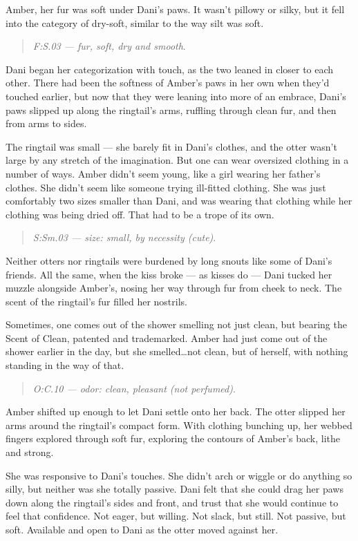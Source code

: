 Amber, her fur was soft under Dani's paws. It wasn't pillowy or silky, but it fell into the category of dry-soft, similar to the way silt was soft.

\begin{quote}
\emph{F:S.03 --- fur, soft, dry and smooth}.
\end{quote}

Dani began her categorization with touch, as the two leaned in closer to each other. There had been the softness of Amber's paws in her own when they'd touched earlier, but now that they were leaning into more of an embrace, Dani's paws slipped up along the ringtail's arms, ruffling through clean fur, and then from arms to sides.

The ringtail was small --- she barely fit in Dani's clothes, and the otter wasn't large by any stretch of the imagination. But one can wear oversized clothing in a number of ways. Amber didn't seem young, like a girl wearing her father's clothes. She didn't seem like someone trying ill-fitted clothing. She was just comfortably two sizes smaller than Dani, and was wearing that clothing while her clothing was being dried off. That had to be a trope of its own.

\begin{quote}
\emph{S:Sm.03 --- size: small, by necessity (cute)}.
\end{quote}

Neither otters nor ringtails were burdened by long snouts like some of Dani's friends. All the same, when the kiss broke --- as kisses do --- Dani tucked her muzzle alongside Amber's, nosing her way through fur from cheek to neck. The scent of the ringtail's fur filled her nostrils.

Sometimes, one comes out of the shower smelling not just clean, but bearing the Scent of Clean, patented and trademarked. Amber had just come out of the shower earlier in the day, but she smelled\ldots{}not clean, but of herself, with nothing standing in the way of that.

\begin{quote}
\emph{O:C.10 --- odor: clean, pleasant (not perfumed)}.
\end{quote}

Amber shifted up enough to let Dani settle onto her back. The otter slipped her arms around the ringtail's compact form. With clothing bunching up, her webbed fingers explored through soft fur, exploring the contours of Amber's back, lithe and strong.

She was responsive to Dani's touches. She didn't arch or wiggle or do anything so silly, but neither was she totally passive. Dani felt that she could drag her paws down along the ringtail's sides and front, and trust that she would continue to feel that confidence. Not eager, but willing. Not slack, but still. Not passive, but soft. Available and open to Dani as the otter moved against her.

